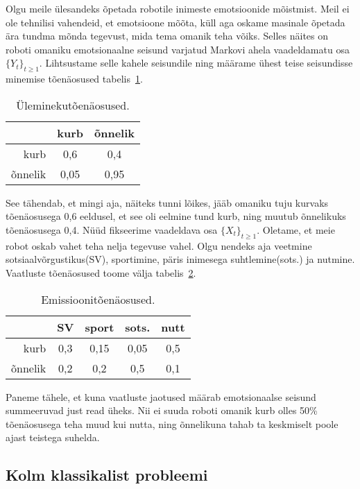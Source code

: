 \begin{example}
Olgu meile ülesandeks õpetada robotile inimeste emotsioonide mõistmist. Meil ei ole tehnilisi vahendeid, et emotsioone mõõta, küll aga oskame masinale õpetada ära tundma mõnda tegevust, mida tema omanik teha võiks.
Selles näites on roboti omaniku emotsionaalne seisund varjatud Markovi ahela vaadeldamatu osa $\{Y_t\}_{t\geq1}$. Lihtsustame selle kahele seisundile ning määrame ühest teise seisundisse minemise tõenäosused tabelis~\ref{fig:HMM.ex.transition}.

\begin{table}[h]
	\centering

	\begin{tabular}{ r | c c }	
						& kurb & õnnelik \\
		\hline
		kurb    & 0,6  & 0,4     \\
		õnnelik & 0,05 & 0,95    \\

	\end{tabular}

	\caption{Üleminekutõenäosused.}
	\label{fig:HMM.ex.transition}
\end{table}

See tähendab, et mingi aja, näiteks tunni lõikes, jääb omaniku tuju kurvaks tõenäosusega 0,6 eeldusel, et see oli eelmine tund kurb, ning muutub õnnelikuks tõenäosusega 0,4.
Nüüd fikseerime vaadeldava osa $\{X_t\}_{t\geq1}$. Oletame, et meie robot oskab vahet teha nelja tegevuse vahel. Olgu nendeks aja veetmine sotsiaalvõrgustikus(SV), sportimine, päris inimesega suhtlemine(sots.) ja nutmine. Vaatluste tõenäosused toome välja tabelis~\ref{fig:HMM.ex.emission}.

\begin{table}[h]
	\centering

	\begin{tabular}{ r | *{4}{c} }	
						& SV 	& sport & sots. & nutt\\
		\hline
			 kurb & 0,3 & 0,15	 & 0,05 & 0,5 \\
		õnnelik & 0,2	& 0,2   & 0,5	& 0,1 \\
	\end{tabular}

	\caption{Emissioonitõenäosused.}
	\label{fig:HMM.ex.emission}
\end{table}

Paneme tähele, et kuna vaatluste jaotused määrab emotsionaalse seisund summeeruvad just read üheks. Nii ei suuda roboti omanik kurb olles 50\% tõenäosusega teha muud kui nutta, ning õnnelikuna tahab ta keskmiselt poole ajast teistega suhelda.

\subsection{Kolm klassikalist probleemi}


\end{example}
